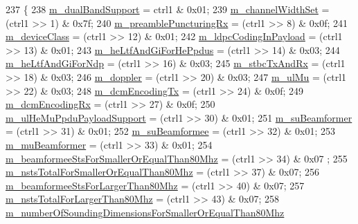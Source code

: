 \begin{DoxyCode}
237 \{
238   \hyperlink{classns3_1_1HeCapabilities_a04f73bb72b43ddef5fb488852125bdb2}{m\_dualBandSupport} = ctrl1 & 0x01;
239   \hyperlink{classns3_1_1HeCapabilities_aa797e3d4f18880c949ef9d3a85077edf}{m\_channelWidthSet} = (ctrl1 >> 1) & 0x7f;
240   \hyperlink{classns3_1_1HeCapabilities_ad180538f4dd3e4c2b1e8aadf36a0075c}{m\_preamblePuncturingRx} = (ctrl1 >> 8) & 0x0f;
241   \hyperlink{classns3_1_1HeCapabilities_aac04f89c46b6cf874ea55f9c8217d778}{m\_deviceClass} = (ctrl1 >> 12) & 0x01;
242   \hyperlink{classns3_1_1HeCapabilities_a536bed2c74547655822291fe6201ee8c}{m\_ldpcCodingInPayload} = (ctrl1 >> 13) & 0x01;
243   \hyperlink{classns3_1_1HeCapabilities_ac0d27f9b4d2a8c9de09e5d5382998ddd}{m\_heLtfAndGiForHePpdus} = (ctrl1 >> 14) & 0x03;
244   \hyperlink{classns3_1_1HeCapabilities_abf0323f232fa7a83f7450fc025d73162}{m\_heLtfAndGiForNdp} = (ctrl1 >> 16) & 0x03;
245   \hyperlink{classns3_1_1HeCapabilities_a8aab94e87c6737a9c43b8d08dfdcd93b}{m\_stbcTxAndRx} = (ctrl1 >> 18) & 0x03;
246   \hyperlink{classns3_1_1HeCapabilities_abcc2b218c56f4d0b84cd4ea433cde69f}{m\_doppler} = (ctrl1 >> 20) & 0x03;
247   \hyperlink{classns3_1_1HeCapabilities_a5e00ff194cfcfb5ea4f7f7262db519a9}{m\_ulMu} = (ctrl1 >> 22) & 0x03;
248   \hyperlink{classns3_1_1HeCapabilities_a7f0d8ca47744f7f0b5ca6eeda52c66e9}{m\_dcmEncodingTx} = (ctrl1 >> 24) & 0x0f;
249   \hyperlink{classns3_1_1HeCapabilities_afe1da2309e85423e9d7b8ca27ca045c2}{m\_dcmEncodingRx} = (ctrl1 >> 27) & 0x0f;
250   \hyperlink{classns3_1_1HeCapabilities_a71f3feb98d53dfeca95de2bf08e41443}{m\_ulHeMuPpduPayloadSupport} = (ctrl1 >> 30) & 0x01;
251   \hyperlink{classns3_1_1HeCapabilities_a8a4e2966d7d67a038a7b08f7d733819c}{m\_suBeamformer} = (ctrl1 >> 31) & 0x01;
252   \hyperlink{classns3_1_1HeCapabilities_a68f6c78532eaaec71445fa9d1bb86f1b}{m\_suBeamformee} = (ctrl1 >> 32) & 0x01;
253   \hyperlink{classns3_1_1HeCapabilities_ab372f215235e3d509eeaf07301687a08}{m\_muBeamformer} = (ctrl1 >> 33) & 0x01;
254   \hyperlink{classns3_1_1HeCapabilities_aa58d62ca4576da470b5d0b3eb31e4bd9}{m\_beamformeeStsForSmallerOrEqualThan80Mhz} = (ctrl1 >> 34) & 0x07
      ;
255   \hyperlink{classns3_1_1HeCapabilities_a005028af78a23140224a61769c938681}{m\_nstsTotalForSmallerOrEqualThan80Mhz} = (ctrl1 >> 37) & 0x07;
256   \hyperlink{classns3_1_1HeCapabilities_a14af7669973c17c133210eb5c6e05e74}{m\_beamformeeStsForLargerThan80Mhz} = (ctrl1 >> 40) & 0x07;
257   \hyperlink{classns3_1_1HeCapabilities_aca46963765d4cbf624622a602994b52b}{m\_nstsTotalForLargerThan80Mhz} = (ctrl1 >> 43) & 0x07;
258   \hyperlink{classns3_1_1HeCapabilities_af3b6c564e48d20f968a8adbf633f96f4}{m\_numberOfSoundingDimensionsForSmallerOrEqualThan80Mhz}

\end{DoxyCode}
